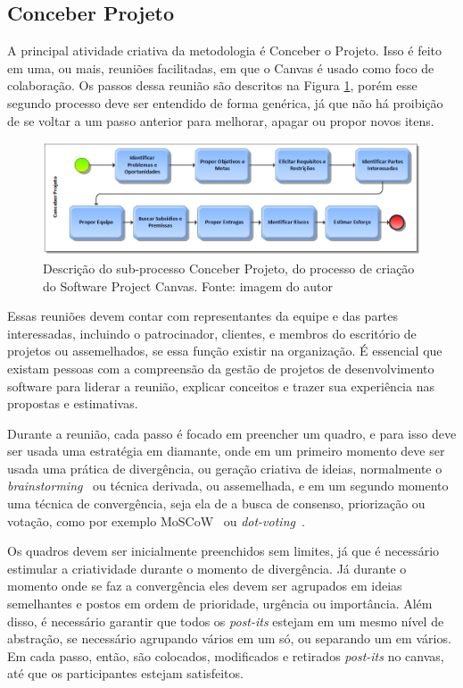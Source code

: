 \documentclass[fontsize=12pt, a4paper,pagesize=auto,toc=listof, ,twoside,chapterprefix=false,appendixprefix=true,open=right]{scrbook}
\begin{document}
\subsection{Conceber Projeto}

A principal atividade criativa da metodologia é Conceber o Projeto. Isso é feito em uma, ou mais, reuniões facilitadas, em que o Canvas é usado como foco de colaboração. Os passos dessa reunião são descritos na Figura \ref{fig:bpmn2}, porém esse segundo processo deve ser entendido de forma genérica, já que não há proibição de se voltar a um passo anterior para melhorar, apagar ou propor novos itens.

\begin{figure}[htb]
    \centering
    \includegraphics[width=\textwidth]{imagens/Conceber Projeto do Software Project Canvas.png}
    \caption{Descrição do sub-processo Conceber Projeto, do processo de criação do Software Project Canvas. Fonte: imagem do autor}
    \label{fig:bpmn2}
\end{figure}


Essas reuniões devem contar com representantes da equipe e das partes interessadas, incluindo o patrocinador, clientes, e membros do escritório de projetos ou assemelhados, se essa função existir na organização. É essencial que existam pessoas com a compreensão da gestão de projetos de desenvolvimento software para liderar a reunião, explicar conceitos e trazer sua experiência nas propostas e estimativas.

Durante a reunião, cada passo é focado em preencher um quadro, e para isso deve ser usada uma estratégia em diamante, onde em um primeiro momento deve ser usada uma prática de divergência, ou geração criativa de ideias, normalmente o \textit{brainstorming}~\citep{tracy:2015} ou técnica derivada, ou assemelhada, e em um segundo momento uma técnica de convergência,  seja ela de a busca de consenso, priorização ou votação, como por exemplo MoSCoW~\citep{dsdm:2nd} ou \textit{dot-voting}~\citep{gray:2010}.

Os quadros devem ser inicialmente preenchidos sem limites, já que é necessário estimular a criatividade durante o momento de divergência. Já durante o momento onde se faz a convergência eles devem ser agrupados em ideias semelhantes e postos em ordem de prioridade, urgência ou importância. Além disso, é necessário garantir que todos os \textit{post-its} estejam em um mesmo nível de abstração, se necessário agrupando vários em um só, ou separando um em vários.
Em cada passo, então, são colocados, modificados e retirados \textit{post-its} no canvas, até que os participantes estejam satisfeitos.
\end{document}

